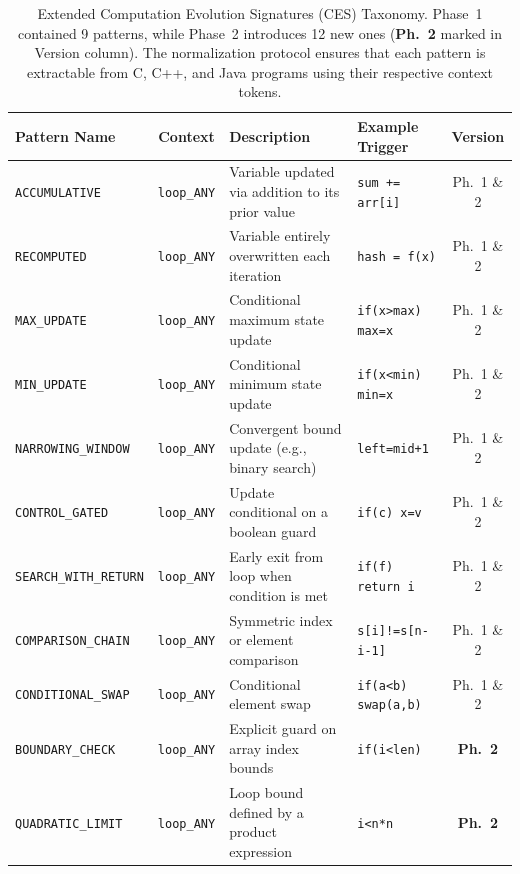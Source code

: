 \begin{table}[tp]
\caption{Extended Computation Evolution Signatures (CES) Taxonomy. Phase~1 contained 9 patterns, while Phase~2 introduces 12 new ones (\textbf{Ph.~2} marked in Version column). The normalization protocol ensures that each pattern is extractable from C, C++, and Java programs using their respective context tokens.}
\label{tab:ces_taxonomy}
\centering
\begin{tabular}{|l|c|p{5.8cm}|l|c|}
\hline
\textbf{Pattern Name} & \textbf{Context} & \textbf{Description} & \textbf{Example Trigger} & \textbf{Version} \\
\hline
\texttt{ACCUMULATIVE}              & \texttt{loop\_ANY} & Variable updated via addition to its prior value & \texttt{sum += arr[i]} & Ph.~1 \& 2 \\
\texttt{RECOMPUTED}                & \texttt{loop\_ANY} & Variable entirely overwritten each iteration & \texttt{hash = f(x)} & Ph.~1 \& 2 \\
\texttt{MAX\_UPDATE}               & \texttt{loop\_ANY} & Conditional maximum state update & \texttt{if(x>max) max=x} & Ph.~1 \& 2 \\
\texttt{MIN\_UPDATE}               & \texttt{loop\_ANY} & Conditional minimum state update & \texttt{if(x<min) min=x} & Ph.~1 \& 2 \\
\texttt{NARROWING\_WINDOW}         & \texttt{loop\_ANY} & Convergent bound update (e.g., binary search) & \texttt{left=mid+1} & Ph.~1 \& 2 \\
\texttt{CONTROL\_GATED}            & \texttt{loop\_ANY} & Update conditional on a boolean guard & \texttt{if(c) x=v} & Ph.~1 \& 2 \\
\texttt{SEARCH\_WITH\_RETURN}      & \texttt{loop\_ANY} & Early exit from loop when condition is met & \texttt{if(f) return i} & Ph.~1 \& 2 \\
\texttt{COMPARISON\_CHAIN}         & \texttt{loop\_ANY} & Symmetric index or element comparison & \texttt{s[i]!=s[n-i-1]} & Ph.~1 \& 2 \\
\texttt{CONDITIONAL\_SWAP}         & \texttt{loop\_ANY} & Conditional element swap & \texttt{if(a<b) swap(a,b)} & Ph.~1 \& 2 \\
\texttt{BOUNDARY\_CHECK}           & \texttt{loop\_ANY} & Explicit guard on array index bounds & \texttt{if(i<len)} & \textbf{Ph.~2} \\
\texttt{QUADRATIC\_LIMIT}          & \texttt{loop\_ANY} & Loop bound defined by a product expression & \texttt{i<n*n} & \textbf{Ph.~2} \\

\end{tabular}
\end{table}
